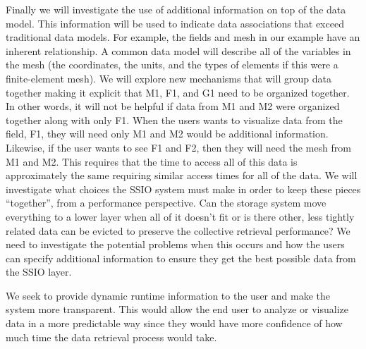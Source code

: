 Finally we will investigate the use of additional information
on top of the data model.
This information will be used to indicate data associations that exceed
traditional data models. For example, the fields and mesh in our example have
an inherent relationship. A common data model will describe all of the
variables in the mesh (the coordinates, the units, and the types of elements if
this were a finite-element mesh). We will explore new mechanisms that will
group data together making it explicit that M1, F1, and G1 need to be organized
together.  In other words, it will not be helpful if data from M1 and M2 were
organized together along with only F1. When the users wants to visualize data
from the field, F1, they will need only M1 and M2 would be additional
information. Likewise, if the user wants to see F1 and F2, then they will need
the mesh from M1 and M2. This requires that the time to access all of this
data is approximately the same requiring similar access times for all of the
data.  We will investigate what choices the SSIO system must make in order to
keep these pieces ``together'', from a performance perspective. Can the storage
system move everything to a lower layer when all of it doesn't fit or is there
other, less tightly related data can be evicted to preserve the collective
retrieval performance?  We need to investigate the potential problems when this
occurs and how the users can specify additional information to ensure they get
the best possible data from the SSIO layer.

We seek to provide dynamic runtime information to the user and make the
system more transparent. This would allow the end user to analyze or
visualize data in a more
predictable way since they would have more confidence of how much time
the data retrieval process would take.

